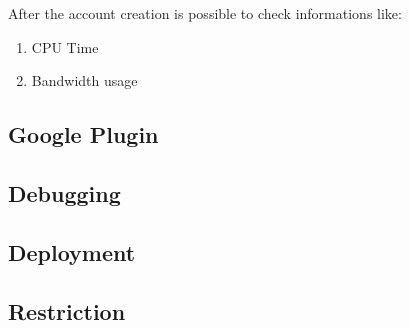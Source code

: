 \documentclass{article}
\begin{document}
After the account creation is possible to check informations like:
\begin{enumerate}
\item CPU Time
\item Bandwidth usage
\end{enumerate}



\subsection{Google Plugin}
\subsection{Debugging}
\subsection{Deployment}
\subsection{Restriction}
\end{document}
